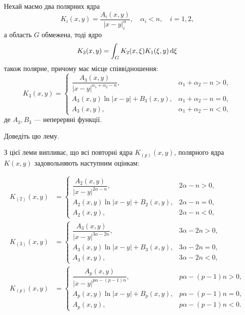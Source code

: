 \begin{lemma}
	\label{lemma:2.1.25}
	Нехай маємо два полярних ядра 
	\begin{equation}
		K_i(x, y) = \frac{A_i(x, y)}{|x - y|^\alpha_i}, \quad \alpha_i < n, \quad i = 1, 2,
	\end{equation}
	а область $G$ обмежена, тоді ядро 
	\begin{equation}
		K_3(x, y) = \int_G K_2(x, \xi) K_1(\xi, y) \mathop{}\!\mathrm{d} \xi
	\end{equation}
	також полярне, причому має місце співвідношення:
	\begin{equation}
		K_3(x, y) = \begin{cases}
			\dfrac{A_3(x, y)}{|x - y|^{\alpha_1 + \alpha_2 - n}}, & \alpha_1 + \alpha_2 - n > 0, \\
			A_3(x, y) \ln|x - y| + B_3(x, y), & \alpha_1 + \alpha_2 - n = 0, \\
			A_3(x, y), & \alpha_1 + \alpha_2 - n < 0,
		\end{cases}
	\end{equation}
	де $A_3, B_3$ --- неперервні функції.
\end{lemma}

\begin{exercise}
	Доведіть цю лему.
\end{exercise}

З цієї леми випливає, що всі повторні ядра $K_{(p)}(x, y)$, полярного ядра $K(x, y)$ задовольняють наступним оцінкам:

\begin{equation}
	\begin{aligned}
		K_{(2)}(x, y) &= \begin{cases}
			\dfrac{A_2(x, y)}{|x - y|^{2\alpha - n}}, & 2\alpha - n > 0, \\
			A_2(x, y) \ln|x - y| + B_2(x, y), & 2\alpha - n = 0, \\
			A_2(x, y), & 2\alpha - n < 0,
		\end{cases} \\
		K_{(3)}(x, y) &= \begin{cases}
			\dfrac{A_3(x, y)}{|x - y|^{3\alpha - 2n}}, & 3\alpha - 2n > 0, \\
			A_3(x, y) \ln|x - y| + B_3(x, y), & 3\alpha - 2n = 0, \\
			A_3(x, y), & 3\alpha - 2n < 0,
		\end{cases} \\
		K_{(p)}(x, y) &= \begin{cases}
			\dfrac{A_p(x, y)}{|x - y|^{p\alpha - (p-1)n}}, & p\alpha - (p - 1)n > 0, \\
			A_p(x, y) \ln|x - y| + B_p(x, y), & p\alpha - (p - 1)n = 0, \\
			A_p(x, y), & p\alpha - (p - 1)n < 0.
		\end{cases}
	\end{aligned}
\end{equation}

